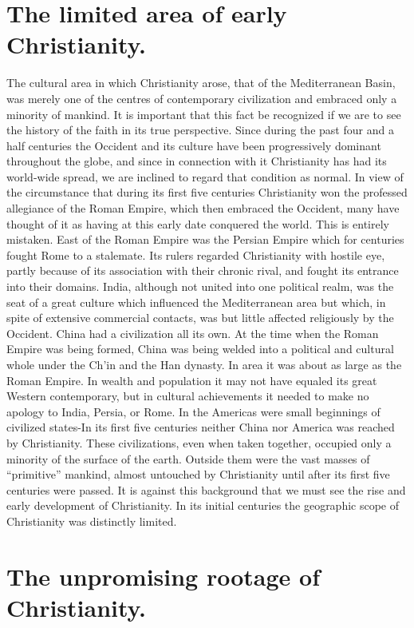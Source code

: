 \section{The limited area of early Christianity.}

The cultural area in which Christianity arose, that of the Mediterranean Basin, was merely one of the centres of contemporary civilization and embraced only a minority of mankind. It is important that this fact be recognized if we are to see the history of the faith in its true perspective. Since during the past four and a half centuries the Occident and its culture have been progressively dominant throughout the globe, and since in connection with it Christianity has had its world-wide spread, we are inclined to regard that condition as normal. In view of the circumstance that during its first five centuries Christianity won the professed allegiance of the Roman Empire, which then embraced the Occident, many have thought of it as having at this early date conquered the world. This is entirely mistaken. East of the Roman Empire was the Persian Empire which for centuries fought Rome to a stalemate. Its rulers regarded Christianity with hostile eye, partly because of its association with their chronic rival, and fought its entrance into their domains. India, although not united into one political realm, was the seat of a great culture which influenced the Mediterranean area but which, in spite of extensive commercial contacts, was but little affected religiously by the Occident. China had a civilization all its own. At the time when the Roman Empire was being formed, China was being welded into a political and cultural whole under the Ch'in and the Han dynasty. In area it was about as large as the Roman Empire. In wealth and population it may not have equaled its great Western contemporary, but in cultural achievements it needed to make no apology to India, Persia, or Rome. In the Americas were small beginnings of civilized states-In its first five centuries neither China nor America was reached by Christianity. These civilizations, even when taken together, occupied only a minority of the surface of the earth. Outside them were the vast masses of ``primitive'' mankind, almost untouched by Christianity until after its first five centuries were passed. It is against this background that we must see the rise and early development of Christianity. In its initial centuries the geographic scope of Christianity was distinctly limited.

\section{The unpromising rootage of Christianity.}

